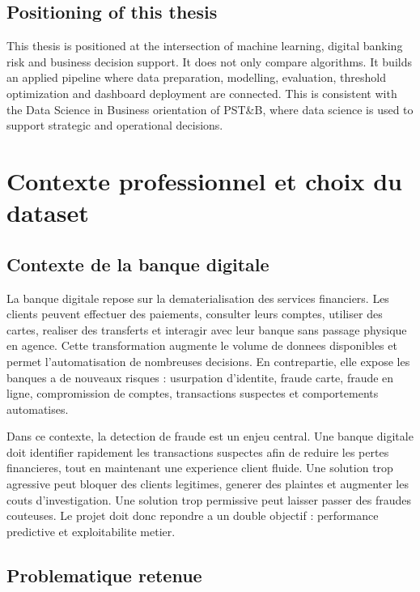 ﻿\documentclass[12pt,a4paper,oneside]{report}
\begin{document}
\section{Positioning of this thesis}

This thesis is positioned at the intersection of machine learning, digital banking risk and business decision support. It does not only compare algorithms. It builds an applied pipeline where data preparation, modelling, evaluation, threshold optimization and dashboard deployment are connected. This is consistent with the Data Science in Business orientation of PST\&B, where data science is used to support strategic and operational decisions.


\chapter{Contexte professionnel et choix du dataset}

\section{Contexte de la banque digitale}

La banque digitale repose sur la dematerialisation des services financiers. Les clients peuvent effectuer des paiements, consulter leurs comptes, utiliser des cartes, realiser des transferts et interagir avec leur banque sans passage physique en agence. Cette transformation augmente le volume de donnees disponibles et permet l'automatisation de nombreuses decisions. En contrepartie, elle expose les banques a de nouveaux risques : usurpation d'identite, fraude carte, fraude en ligne, compromission de comptes, transactions suspectes et comportements automatises.

Dans ce contexte, la detection de fraude est un enjeu central. Une banque digitale doit identifier rapidement les transactions suspectes afin de reduire les pertes financieres, tout en maintenant une experience client fluide. Une solution trop agressive peut bloquer des clients legitimes, generer des plaintes et augmenter les couts d'investigation. Une solution trop permissive peut laisser passer des fraudes couteuses. Le projet doit donc repondre a un double objectif : performance predictive et exploitabilite metier.

\section{Problematique retenue}
\end{document}
